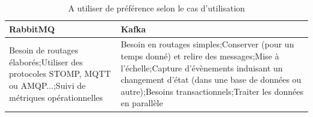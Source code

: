 \documentclass[11pt]{article}
\begin{document}
			\begin{table}
				\begin{tabular}{|p{7.5cm}|p{7.5cm}|}
				\hline
				\rowcolor{lightgray} RabbitMQ & Kafka\\\hline
				Besoin de routages élaborés;\newline Utiliser des protocoles STOMP, MQTT ou AMQP...;\newline Suivi de métriques opérationnelles & Besoin en routages simples;\newline Conserver (pour un temps donné) et relire des messages;\newline Mise à l’échelle;\newline Capture d’évènements induisant un changement d’état (dans une base de données ou autre);\newline Besoins transactionnels;\newline Traiter les données en parallèle\\\hline
				\end{tabular}
				\caption{A utiliser de préférence selon le cas d'utilisation}
				\label{tab:comparatifpref}
			\end{table}
\end{document}

